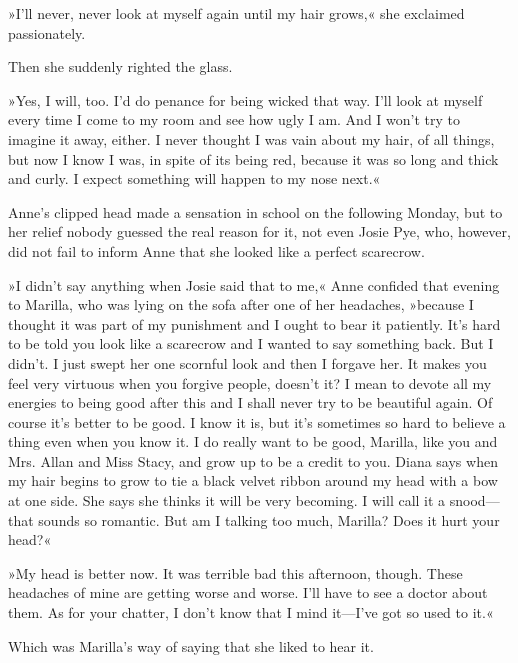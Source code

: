 »I'll never, never look at myself again until my hair grows,« she exclaimed passionately.

Then she suddenly righted the glass.

»Yes, I will, too. I'd do penance for being wicked that way. I'll look at myself every time I come to my room and see how ugly I am. And I won't try to imagine it away, either. I never thought I was vain about my hair, of all things, but now I know I was, in spite of its being red, because it was so long and thick and curly. I expect something will happen to my nose next.«

Anne's clipped head made a sensation in school on the following Monday, but to her relief nobody guessed the real reason for it, not even Josie Pye, who, however, did not fail to inform Anne that she looked like a perfect scarecrow.

»I didn't say anything when Josie said that to me,« Anne confided that evening to Marilla, who was lying on the sofa after one of her headaches, »because I thought it was part of my punishment and I ought to bear it patiently. It's hard to be told you look like a scarecrow and I wanted to say something back. But I didn't. I just swept her one scornful look and then I forgave her. It makes you feel very virtuous when you forgive people, doesn't it? I mean to devote all my energies to being good after this and I shall never try to be beautiful again. Of course it's better to be good. I know it is, but it's sometimes so hard to believe a thing even when you know it. I do really want to be good, Marilla, like you and Mrs. Allan and Miss Stacy, and grow up to be a credit to you. Diana says when my hair begins to grow to tie a black velvet ribbon around my head with a bow at one side. She says she thinks it will be very becoming. I will call it a snood—that sounds so romantic. But am I talking too much, Marilla? Does it hurt your head?«

»My head is better now. It was terrible bad this afternoon, though. These headaches of mine are getting worse and worse. I'll have to see a doctor about them. As for your chatter, I don't know that I mind it—I've got so used to it.«

Which was Marilla's way of saying that she liked to hear it.

